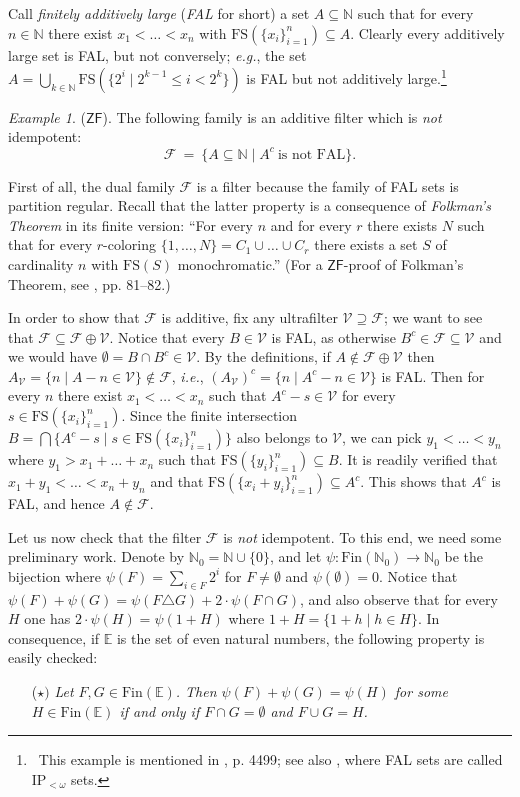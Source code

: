 \documentclass{amsart}
\theoremstyle{definition}
\theoremstyle{remark}
\newtheorem{example}[theorem]{Example}
\def\F{\mathscr{F}}
\def\V{\mathscr{V}}
\def\E{\mathbb{E}}
\def\N{\mathbb{N}}
\def\Fin{\text{Fin}}
\begin{document}
Call \emph{finitely additively large} (\emph{FAL} for short) 
a set $A\subseteq\N$ such that for every $n\in\N$ there exist
$x_1<\ldots<x_n$ with $\text{FS}(\{x_i\}_{i=1}^{n})\subseteq A$.
Clearly every additively large set is FAL, but not
conversely; \emph{e.g.}, the set 
$A=\bigcup_{k\in\N} \text{FS}(\{2^i\mid 2^{k-1}\le i<2^k\})$
is FAL but not additively large.\footnote
{~This example is mentioned in
\cite{bh2}, p. 4499; see also \cite[Theorem 1.12]{bh}, where 
FAL sets are called $\text{IP}_{<\omega}$ sets.}

\begin{example}\label{additivenotidem}
($\mathsf{ZF}$). The following family is an additive filter which is \emph{not} idempotent:
$$\F\ =\ \{A\subseteq\N\mid A^c\ \text{is not FAL}\}.$$

First of all, the dual family $\F$ is a filter because
the family of FAL sets is partition regular. Recall that the latter 
property is a consequence of \emph{Folkman's Theorem}
in its finite version:
``For every $n$ and for every $r$ there exists $N$
such that for every $r$-coloring $\{1,\ldots,N\}=C_1\cup\ldots\cup C_r$
there exists a set $S$ of cardinality $n$ with $\text{FS}(S)$ monochromatic.''
(For a $\textsf{ZF}$-proof of Folkman's Theorem, see
\cite[Theorem 11, Lemma 12]{grs}, pp. 81--82.)

In order to show that $\F$ is additive, fix any ultrafilter
$\V\supseteq\F$; we want to see that $\F\subseteq\F\oplus\V$.
Notice that every $B\in\V$ is FAL, as otherwise
$B^c\in\F\subseteq\V$ and we would have $\emptyset=B\cap B^c\in\V$.
By the definitions,
if $A\notin\F\oplus\V$ then
$A_\V=\{n\mid A-n\in\V\}\not\in\F$, \emph{i.e.},
$(A_\V)^c=\{n\mid A^c-n\in\V\}$ is FAL.
Then for every $n$ there exist 
$x_1<\ldots<x_n$ such that 
$A^c-s\in\V$ for every $s\in\text{FS}(\{x_i\}_{i=1}^{n})$.
Since the finite intersection 
$B=\bigcap\{A^c-s\mid s\in\text{FS}(\{x_i\}_{i=1}^{n})\}$ also belongs to $\V$,
we can pick $y_1<\ldots<y_n$ where $y_1>x_1+\ldots+x_n$
such that $\text{FS}(\{y_i\}_{i=1}^{n})\subseteq B$.
It is readily verified that $x_1+y_1<\ldots<x_n+y_n$
and that $\text{FS}(\{x_i+y_i\}_{i=1}^{n})\subseteq A^c$.
This shows that $A^c$ is FAL, and hence $A\not\in\F$.

Let us now check that the filter $\F$ is \emph{not} idempotent. 
To this end, we need some preliminary work.
Denote by $\N_0=\N\cup\{0\}$, and let $\psi:\Fin(\N_0)\to\N_0$ 
be the bijection where $\psi(F)=\sum_{i\in F}2^i$ for $F\ne\emptyset$
and $\psi(\emptyset)=0$.
Notice that $\psi(F)+\psi(G)=\psi(F\triangle G)+2\cdot\psi(F\cap G)$,
and also observe that for every $H$ one has
$2\cdot\psi(H)=\psi(1+H)$ where $1+H=\{1+h\mid h\in H\}$.
In consequence, if $\E$ is the set of even natural numbers, 
the following property is easily checked:
\begin{itemize}
\item[($\star)$]
\emph{Let $F,G\in\Fin(\E)$. Then $\psi(F)+\psi(G)=\psi(H)$ for some 
$H\in\text{Fin}(\E)$
if and only if $F\cap G=\emptyset$ and $F\cup G=H$.}
\end{itemize}


\end{example}
\end{document}
